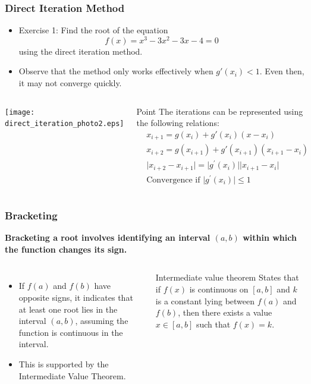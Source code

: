   \begin{frame}[fragile]
    \frametitle{Direct Iteration Method}
  
    \begin{itemize}
      \item Exercise 1: Find the root of the equation
        \[
        f(x) = x^3 -3x^2 - 3x - 4 = 0
        \]
        using the direct iteration method.
      \item Observe that the method only works effectively when \(g'(x_i) < 1\). Even then, it may not converge quickly. 
    \end{itemize}
    \begin{columns}
    \texttt{[image: direct\_iteration\_photo2.eps]}
    \vspace{-0.5cm} 
    \begin{block}{Point}
      The iterations can be represented using the following relations:
      \begin{align*}
        & x_{i+1} = g(x_i) + g'(x_i)(x - x_i) \\
        & x_{i+2} = g(x_{i+1}) + g'(x_{i+1})(x_{i+1} - x_i) \\
        & \lvert x_{i+2} - x_{i+1} \rvert = \lvert g^\prime (x_i) \rvert \lvert x_{i+1} - x_i \rvert \\
        & \text{Convergence if } \lvert g^\prime (x_i) \rvert \leq 1
      \end{align*} 
    \end{block}    
    \end{columns}
  \end{frame}
  
  \begin{frame}[fragile]
    \frametitle{Bracketing}
    
    \textbf{Bracketing a root involves identifying an interval \((a, b)\) within which the function changes its sign.}
    \begin{columns}
      \vspace{0.25cm}
       
      \vspace{0.25cm}
        
    \begin{itemize}
      \item If \(f(a)\) and \(f(b)\) have opposite signs, it indicates that at least one root lies in the interval \((a, b)\), assuming the function is continuous in the interval.
      \item This is supported by the Intermediate Value Theorem.
    \end{itemize}
    \begin{block}{Intermediate value theorem}
      States that if \(f(x)\) is continuous on \([a, b]\) and \(k\) is a constant lying between \(f(a)\) and \(f(b)\), then there exists a value \(x \in [a, b]\) such that \(f(x) = k\).
    \end{block}
    \end{columns}
  
  \end{frame}

